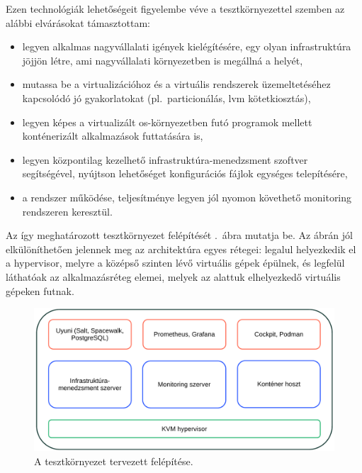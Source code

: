 Ezen technológiák lehetőségeit figyelembe véve a tesztkörnyezettel szemben az alábbi elvárásokat támasztottam:
\begin{itemize}
	\item legyen alkalmas nagyvállalati igények kielégítésére, egy olyan infrastruktúra jöjjön létre, ami nagyvállalati környezetben is megállná a helyét,
	\item mutassa be a virtualizációhoz és a virtuális rendszerek üzemeltetéséhez kapcsolódó jó gyakorlatokat (pl.~particionálás, \acrshort{lvm} kötetkiosztás),
	\item legyen képes a virtualizált \acrshort{os}-környezetben futó programok mellett konténerizált alkalmazások futtatására is,
	\item legyen központilag kezelhető infrastruktúra-menedzsment szoftver segítségével, nyújtson lehetőséget konfigurációs fájlok egységes telepítésére,
	\item a rendszer működése, teljesítménye legyen jól nyomon követhető monitoring rendszeren keresztül.
\end{itemize}

Az így meghatározott tesztkörnyezet felépítését .~ábra mutatja be. Az ábrán jól elkülöníthetően jelennek meg az architektúra egyes rétegei: legalul helyezkedik el a \gls{hypervisor}, melyre a középső szinten lévő virtuális gépek épülnek, és legfelül láthatóak az alkalmazásréteg elemei, melyek az alattuk elhelyezkedő virtuális gépeken futnak.

\begin{figure}[!ht]
	\centering
	\includegraphics[width=15cm]{figures/architektura.pdf}
	\caption{A tesztkörnyezet tervezett felépítése.}
	\label{fig:test-env-arch}
\end{figure}

